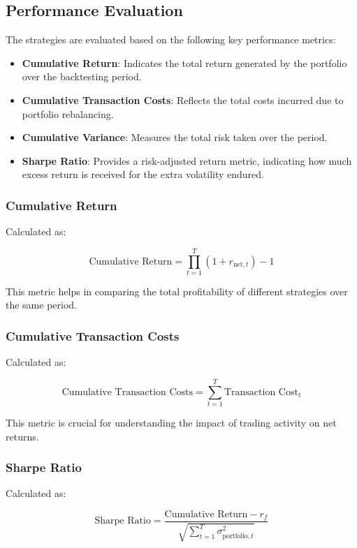 \subsection{Performance Evaluation}

The strategies are evaluated based on the following key performance metrics:

\begin{itemize}
    \item \textbf{Cumulative Return}: Indicates the total return generated by the portfolio over the backtesting period.
    \item \textbf{Cumulative Transaction Costs}: Reflects the total costs incurred due to portfolio rebalancing.
    \item \textbf{Cumulative Variance}: Measures the total risk taken over the period.
    \item \textbf{Sharpe Ratio}: Provides a risk-adjusted return metric, indicating how much excess return is received for the extra volatility endured.
\end{itemize}

\subsubsection{Cumulative Return}

Calculated as:

\[
\text{Cumulative Return} = \prod_{t=1}^T (1 + r_{\text{net}, t}) - 1
\]

This metric helps in comparing the total profitability of different strategies over the same period.

\subsubsection{Cumulative Transaction Costs}

Calculated as:

\[
\text{Cumulative Transaction Costs} = \sum_{t=1}^T \text{Transaction Cost}_t
\]

This metric is crucial for understanding the impact of trading activity on net returns.

\subsubsection{Sharpe Ratio}

Calculated as:

\[
\text{Sharpe Ratio} = \frac{\text{Cumulative Return} - r_f}{\sqrt{\sum_{t=1}^T \sigma_{\text{portfolio}, t}^2}}
\]

